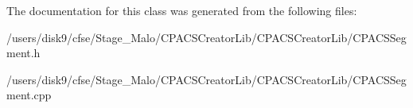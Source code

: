 The documentation for this class was generated from the following files\-:\begin{DoxyCompactItemize}
\item 
/users/disk9/cfse/\-Stage\-\_\-\-Malo/\-C\-P\-A\-C\-S\-Creator\-Lib/\-C\-P\-A\-C\-S\-Creator\-Lib/C\-P\-A\-C\-S\-Segment.\-h\item 
/users/disk9/cfse/\-Stage\-\_\-\-Malo/\-C\-P\-A\-C\-S\-Creator\-Lib/\-C\-P\-A\-C\-S\-Creator\-Lib/C\-P\-A\-C\-S\-Segment.\-cpp\end{DoxyCompactItemize}
